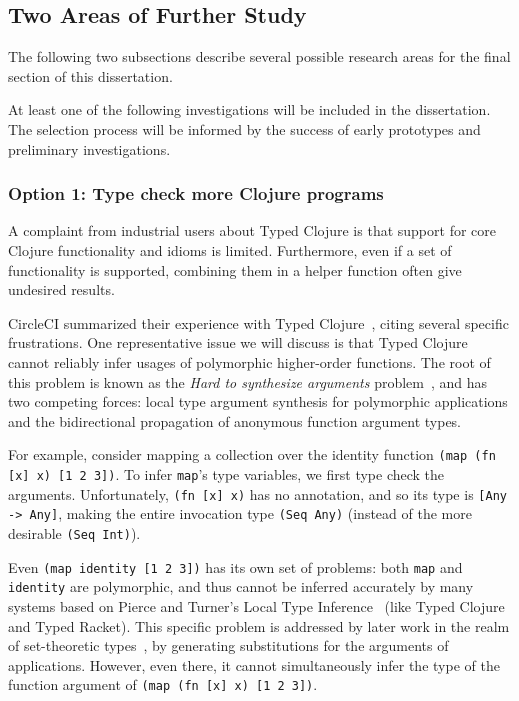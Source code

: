 \documentclass[9pt]{extarticle}
\begin{document}
\subsection{Two Areas of Further Study}

The following two subsections describe
several possible research areas for the final section of this
dissertation.

At least one of the following investigations will be included in the dissertation.
The selection process will be informed by the success of early prototypes
and preliminary investigations.

\subsubsection{Option 1: Type check more Clojure programs}

A complaint from industrial users about Typed Clojure is that support for
core Clojure functionality and idioms is limited.
Furthermore, even if
a set of functionality is supported, combining them in a helper function
often give undesired results.

CircleCI summarized their experience with Typed Clojure~\cite{CircleCIBlog}, citing
several specific frustrations. One representative issue we will discuss
is that Typed Clojure cannot reliably infer usages of polymorphic higher-order functions.
The root of this problem is known as the \emph{Hard to synthesize arguments} problem~\cite{hosoya1999good}, and
has two competing forces: local type argument synthesis for polymorphic applications and
the bidirectional propagation of anonymous function argument types.

For example, consider mapping a collection over the identity function \texttt{(map (fn [x] x) [1 2 3])}.
To infer \texttt{map}'s type variables, we first type check the arguments.
Unfortunately, \texttt{(fn [x] x)} has no annotation, and so its type is \texttt{[Any -> Any]}, making
the entire invocation type \texttt{(Seq Any)} (instead of the more desirable \texttt{(Seq Int)}).

Even \texttt{(map identity [1 2 3])} has its own set of problems: both
\texttt{map} and \texttt{identity} are polymorphic, and thus cannot be inferred accurately by 
many systems based on Pierce and Turner's Local Type Inference~\cite{PierceLTI} (like Typed Clojure and Typed Racket).
This specific problem is addressed by later work in the realm of set-theoretic types~\cite{polyduce2},
by generating substitutions for the arguments of applications. However, even
there, it cannot simultaneously infer the type of the function argument of
\texttt{(map (fn [x] x) [1 2 3])}.
\end{document}
